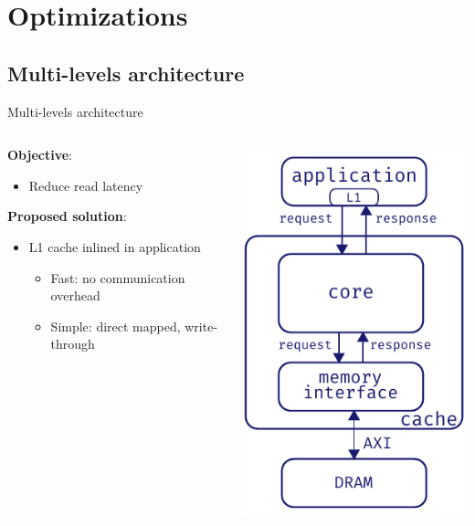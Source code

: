 \documentclass[aspectratio=169]{beamer}
\begin{document}
\section{Optimizations}
\subsection{Multi-levels architecture}
\begin{frame}{Multi-levels architecture}
	\begin{columns}[c]
		\begin{column}{.55\textwidth}
			\textbf{Objective}:
			\begin{itemize}
				\item Reduce read latency
			\end{itemize}
			
			\bigskip
			\textbf{Proposed solution}:
			\begin{itemize}
				\item L1 cache inlined in application
					\begin{itemize}
						\item Fast: no communication overhead
						\item Simple: direct mapped, write-through
					\end{itemize}
			\end{itemize}
		\end{column}
		\begin{column}{.5\textwidth}
			\begin{center}
			\includegraphics[height=.7\textheight]{l1_arch}
			\end{center}
		\end{column}
	\end{columns}
\end{frame}
\end{document}
